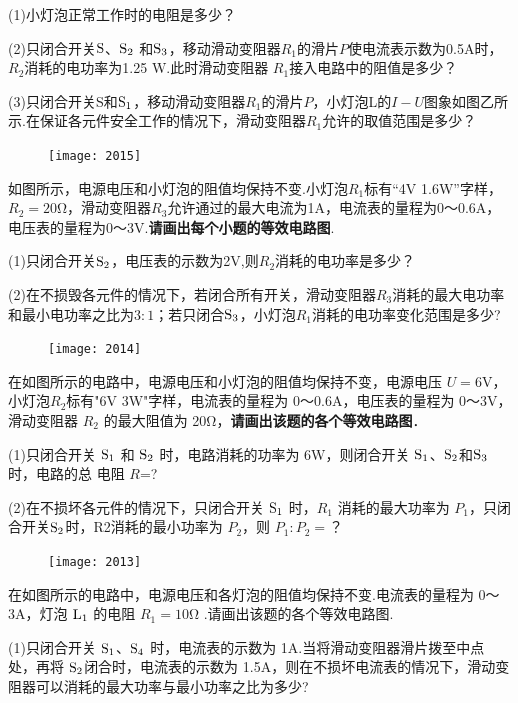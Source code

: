 \documentclass[11pt,a4paper]{article}
\newcommand{\nianfen}[1]{\hspace{-2em}{(#1\textbf{·}\textit{青岛})}}
\begin{document}
{	(1)小灯泡正常工作时的电阻是多少？
	
	(2)只闭合开关$\rm S $、$\rm S_2 $ 和$\rm S_3 $，移动滑动变阻器$ R_1 $的滑片$ P $使电流表示数为0.5A时，$ R_2 $消耗的电功率为1.25 W.此时滑动变阻器 $ R_1 $接入电路中的阻值是多少？
	
	(3)只闭合开关S和$\rm S_1 $，移动滑动变阻器$ R_1 $的滑片$ P $，小灯泡L的$ I-U $图象如图乙所示.在保证各元件安全工作的情况下，滑动变阻器$ R_1 $允许的取值范围是多少？
	\clearpage
	
	\begin{figure}
		\texttt{[image: 2015]}
	\end{figure}

	\nianfen{2015}如图所示，电源电压和小灯泡的阻值均保持不变.小灯泡$ R_1 $标有“4V 1.6W”字样，$ R_2=20$Ω，滑动变阻器$ R_3 $允许通过的最大电流为1A，电流表的量程为0～0.6A，电压表的量程为0～3V.\textbf{请画出每个小题的等效电路图}.

	(1)只闭合开关$\rm S_2 $，电压表的示数为2V,则$R_2$消耗的电功率是多少？
	
	(2)在不损毁各元件的情况下，若闭合所有开关，滑动变阻器$R_3$消耗的最大电功率和最小电功率之比为$3:1$；若只闭合$\rm S_3$，小灯泡$R_1$消耗的电功率变化范围是多少?
	\clearpage
	
	\begin{figure}
	\texttt{[image: 2014]}
	\end{figure}

	\nianfen{2014}在如图所示的电路中，电源电压和小灯泡的阻值均保持不变，电源电压 $ U=6 $V，小灯泡$ R_2 $标有"6V  3W"字样，电流表的量程为 0～0.6A，电压表的量程为 0～3V，滑动变阻器 $ R_2 $ 的最大阻值为 20Ω，\textbf{请画出该题的各个等效电路图}．
	
	(1)只闭合开关 $\rm S_1 $ 和 $\rm S_2 $ 时，电路消耗的功率为 6W，则闭合开关 $\rm S_1 $、$\rm S_2 $和$\rm S_3 $时，电路的总
	电阻 $ R $=?
	
	(2)在不损坏各元件的情况下，只闭合开关 $\rm S_1 $ 时，$ R_1 $ 消耗的最大功率为 $ P_1 $，只闭合开关$\rm S_2 $时，R2消耗的最小功率为 $ P_2 $，则 $ P_1:P_2= $？
	\clearpage
	
	\begin{figure}
		\texttt{[image: 2013]}
	\end{figure}
	
	\nianfen{2013}在如图所示的电路中，电源电压和各灯泡的阻值均保持不变.电流表的量程为 0～3A，灯泡 $\rm L_1 $ 的电阻 $ R_1=10 $Ω .请画出该题的各个等效电路图.
	
	(1)只闭合开关 $\rm S_1 $、$\rm S_4 $ 时，电流表的示数为 1A.当将滑动变阻器滑片拨至中点处，再将 $\rm S_2 $闭合时，电流表的示数为 1.5A，则在不损坏电流表的情况下，滑动变阻器可以消耗的最大功率与最小功率之比为多少?
	
}
\end{document}

